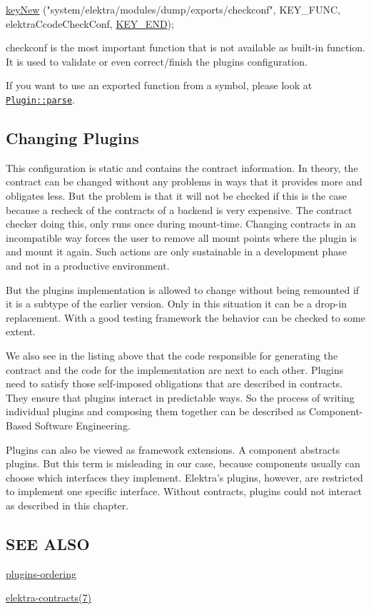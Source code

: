 \begin{DoxyCode}
\hyperlink{group__key_gad23c65b44bf48d773759e1f9a4d43b89}{keyNew} (\textcolor{stringliteral}{"system/elektra/modules/dump/exports/checkconf"}, KEY\_FUNC,
        elektraCcodeCheckConf, \hyperlink{group__key_gga91fb3178848bd682000958089abbaf40aa8adb6fcb92dec58fb19410eacfdd403}{KEY\_END});
\end{DoxyCode}


{\ttfamily checkconf} is the most important function that is not available as built-\/in function. It is used to validate or even correct/finish the plugin\textquotesingle{}s configuration.

If you want to use an exported function from a symbol, please look at \href{/home/markus/Projekte/Elektra/current/src/libs/tools/src/plugin.cpp}{\tt Plugin\+::parse}.

\subsection*{Changing Plugins}

This configuration is static and contains the contract information. In theory, the contract can be changed without any problems in ways that it provides more and obligates less. But the problem is that it will not be checked if this is the case because a recheck of the contracts of a backend is very expensive. The contract checker doing this, only runs once during mount-\/time. Changing contracts in an incompatible way forces the user to remove all mount points where the plugin is and mount it again. Such actions are only sustainable in a development phase and not in a productive environment.

But the plugin\textquotesingle{}s implementation is allowed to change without being remounted if it is a subtype of the earlier version. Only in this situation it can be a drop-\/in replacement. With a good testing framework the behavior can be checked to some extent.

We also see in the listing above that the code responsible for generating the contract and the code for the implementation are next to each other. Plugins need to satisfy those self-\/imposed obligations that are described in contracts. They ensure that plugins interact in predictable ways. So the process of writing individual plugins and composing them together can be described as Component-\/\+Based Software Engineering.

Plugins can also be viewed as framework extensions. A component abstracts plugins. But this term is misleading in our case, because components usually can choose which interfaces they implement. Elektra’s plugins, however, are restricted to implement one specific interface. Without contracts, plugins could not interact as described in this chapter.

\subsection*{S\+EE A\+L\+SO}


\begin{DoxyItemize}
\item \hyperlink{doc_dev_plugins-ordering_md}{plugins-\/ordering}
\item \hyperlink{doc_help_elektra-contracts_md}{elektra-\/contracts(7)} 
\end{DoxyItemize}